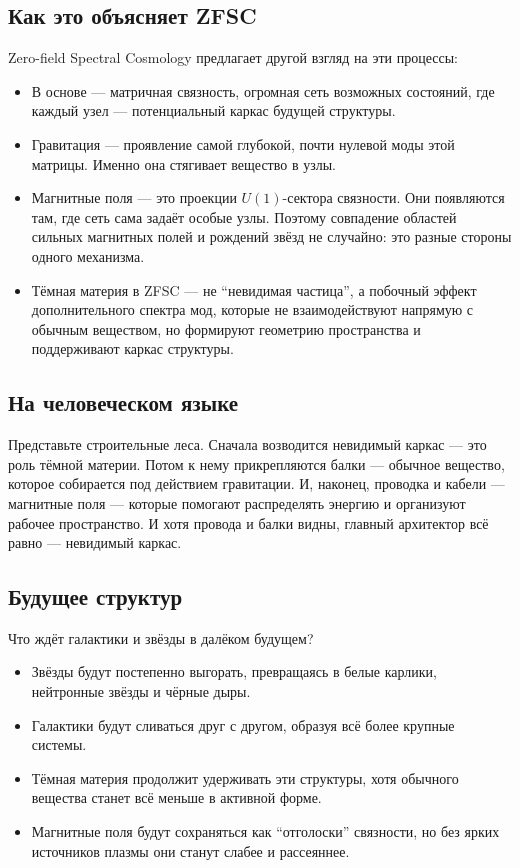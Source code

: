 \documentclass[a4paper,12pt]{article}
\begin{document}
\subsection*{Как это объясняет ZFSC}
Zero-field Spectral Cosmology предлагает другой взгляд на эти процессы:
\begin{itemize}
  \item В основе --- матричная связность, огромная сеть возможных состояний, где каждый узел --- потенциальный каркас будущей структуры.
  \item Гравитация --- проявление самой глубокой, почти нулевой моды этой матрицы. Именно она стягивает вещество в узлы.
  \item Магнитные поля --- это проекции $U(1)$-сектора связности. Они появляются там, где сеть сама задаёт особые узлы. Поэтому совпадение областей сильных магнитных полей и рождений звёзд не случайно: это разные стороны одного механизма.
  \item Тёмная материя в ZFSC --- не ``невидимая частица'', а побочный эффект дополнительного спектра мод, которые не взаимодействуют напрямую с обычным веществом, но формируют геометрию пространства и поддерживают каркас структуры.
\end{itemize}

\subsection*{На человеческом языке}
Представьте строительные леса. Сначала возводится невидимый каркас --- это роль тёмной материи. Потом к нему прикрепляются балки --- обычное вещество, которое собирается под действием гравитации. И, наконец, проводка и кабели --- магнитные поля --- которые помогают распределять энергию и организуют рабочее пространство.  
И хотя провода и балки видны, главный архитектор всё равно --- невидимый каркас.

\subsection*{Будущее структур}
Что ждёт галактики и звёзды в далёком будущем?
\begin{itemize}
  \item Звёзды будут постепенно выгорать, превращаясь в белые карлики, нейтронные звёзды и чёрные дыры.
  \item Галактики будут сливаться друг с другом, образуя всё более крупные системы.
  \item Тёмная материя продолжит удерживать эти структуры, хотя обычного вещества станет всё меньше в активной форме.
  \item Магнитные поля будут сохраняться как ``отголоски'' связности, но без ярких источников плазмы они станут слабее и рассеяннее.
\end{itemize}
\end{document}
